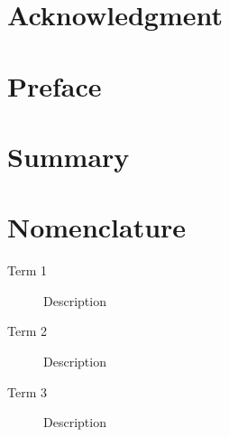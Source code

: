 \documentclass[pdf,12pt,report,strict]{SANDreport}
\title{}
\author{}		%
\date{}		%
\begin{document}
    \maketitle

    \begin{abstract}
    \end{abstract}


    \clearpage
    \chapter*{Acknowledgment}


    \cleardoublepage		%
    \tableofcontents
    \listoffigures
    \listoftables


    \clearpage
    \chapter*{Preface}


    \clearpage
    \chapter*{Summary}


    \clearpage
    \chapter*{Nomenclature}
    \begin{description}
	\item[Term 1]
	    Description
	\item[Term 2]
	    Description
	\item[Term 3]
	    Description
    \end{description}
\end{document}
